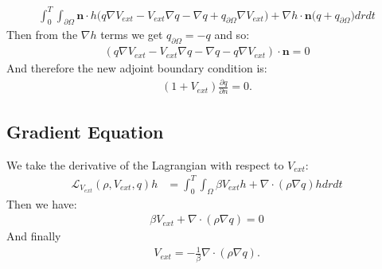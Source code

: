 \documentclass[11pt, a4paper]{article}
\theoremstyle{definition}
\newcommand{\n}{\mathbf{n}}
\begin{document}
	\begin{align*}
		\int_0^T \int_{\partial \Omega} \n \cdot h \bigg(q  \nabla V_{ext} -  V_{ext} \nabla q -\nabla q + q_{\partial \Omega} \nabla V_{ext} \bigg) +
		\nabla h \cdot \n \bigg(q  + q_{\partial \Omega}  \bigg)dr dt
	\end{align*}
	Then from the $\nabla h$ terms we get $q_{\partial \Omega} = - q$ and so:
	\begin{align*}
		(q  \nabla V_{ext} -  V_{ext} \nabla q -\nabla q - q \nabla V_{ext}  ) \cdot \n = 0
	\end{align*}
	And therefore the new adjoint boundary condition is:
	\begin{align*}
		(1 + V_{ext})\frac{\partial q}{\partial n} = 0.
	\end{align*}

	\subsection{Gradient Equation}
	We take the derivative of the Lagrangian with respect to $V_{ext}$:
	\begin{align*}
		\mathcal{L}_{V_{ext}} (\rho, V_{ext},q)h &= \int_0^T \int_\Omega \beta V_{ext} h + \nabla \cdot (\rho \nabla q) h dr dt 
	\end{align*}
	Then we have:
	\begin{align*}
		\beta V_{ext}  + \nabla \cdot (\rho \nabla q)  = 0
	\end{align*}
	And finally 
	\begin{align*}
		V_{ext} = - \frac{1}{\beta} \nabla \cdot (\rho \nabla q).
	\end{align*}
	
	
\end{document}
